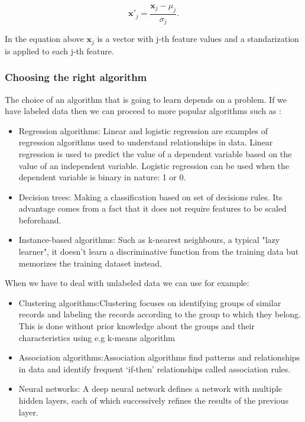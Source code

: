 \documentclass[a4paper,oneside,openright,11pt]{book}
\begin{document}

\begin{equation}
    \textbf{x}'_{j} = \frac{\textbf{x}_{j} - \mu_{j}}{\sigma_{j}}.
\end{equation}

In the equation above $\textbf{x}_j$ is a vector with j-th feature values and a standarization is applied to each j-th feature.

\subsubsection{Choosing the right algorithm}

The choice of an algorithm that is going to learn depends on a problem. If we have labeled data then we can proceed to more popular algorithms such as \cite{raschka}:

\begin{itemize}
    \item Regression algorithms: Linear and logistic regression are examples of regression algorithms used to understand relationships in data. Linear regression is used to predict the value of a dependent variable based on the value of an independent variable. Logistic regression can be used when the dependent variable is binary in nature: 1 or 0.
    \item Decision trees: Making a classification based on set of decisions rules. Its advantage comes from a fact that it does not require features to be scaled beforehand.
    \item Instance-based algorithms: Such as k-nearest neighbours, a typical "lazy learner", it doesn't learn a discriminative function from the training data but memorizes the training dataset instead.
\end{itemize}

When we have to deal with unlabeled data we can use for example:

\begin{itemize}
    \item Clustering algorithms:Clustering focuses on identifying groups of similar records and labeling the records according to the group to which they belong. This is done without prior knowledge about the groups and their characteristics using e.g k-means algorithm
    \item Association algorithms:Association algorithms find patterns and relationships in data and identify frequent ‘if-then’ relationships called association rules.
    \item Neural networks:  A deep neural network defines a network with multiple hidden layers, each of which successively refines the results of the previous layer. 
\end{itemize}
\end{document}
